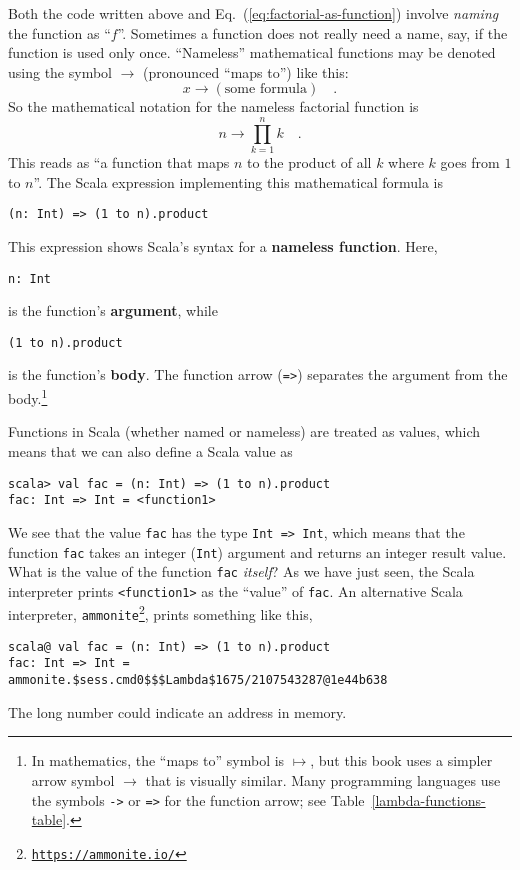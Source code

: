 Both the code written above and Eq.~(\ref{eq:factorial-as-function})
involve \emph{naming} the function as \textsf{``}$f$\textsf{''}. Sometimes a function
does not really need a name, \textemdash{} say, if the function is
used only once. \textsf{``}Nameless\textsf{''} mathematical functions may be denoted
using the symbol $\rightarrow$ (pronounced \textsf{``}maps to\textsf{''}) like this:
\[
x\rightarrow\left(\text{some formula}\right)\quad.
\]
So the mathematical notation for the nameless factorial function is
\[
n\rightarrow\prod_{k=1}^{n}k\quad.
\]
This reads as \textsf{``}a function that maps $n$ to the product of all $k$
where $k$ goes from $1$ to $n$\textsf{''}. The Scala expression implementing
this mathematical formula is
\begin{lstlisting}
(n: Int) => (1 to n).product
\end{lstlisting}
This expression shows Scala\textsf{'}s syntax for a \textbf{nameless function}.
Here, 
\begin{lstlisting}
n: Int
\end{lstlisting}
is the function\textsf{'}s \textbf{argument}, while
\begin{lstlisting}
(1 to n).product
\end{lstlisting}
is the function\textsf{'}s \textbf{body}. The function arrow (\lstinline!=>!)
separates the argument from the body.\footnote{In mathematics, the \textsf{``}maps to\textsf{''} symbol is $\mapsto$, but this book
uses a simpler arrow symbol $\rightarrow$ that is visually similar.
Many programming languages use the symbols \lstinline!->! or \lstinline!=>!
for the function arrow; see Table~\ref{lambda-functions-table}.} 

Functions in Scala (whether named or nameless) are treated as values,
which means that we can also define a Scala value as
\begin{lstlisting}
scala> val fac = (n: Int) => (1 to n).product
fac: Int => Int = <function1>
\end{lstlisting}
We see that the value \lstinline!fac! has the type \lstinline!Int => Int!,
which means that the function \lstinline!fac! takes an integer (\lstinline!Int!)
argument and returns an integer result value. What is the value of
the function \lstinline!fac! \emph{itself}? As we have just seen,
the Scala interpreter prints \lstinline!<function1>! as the \textsf{``}value\textsf{''}
of \lstinline!fac!. An alternative Scala interpreter, \texttt{ammonite}\footnote{\texttt{\href{https://ammonite.io/}{https://ammonite.io/}}},
prints something like this,
\begin{lstlisting}
scala@ val fac = (n: Int) => (1 to n).product
fac: Int => Int = ammonite.$sess.cmd0$$$Lambda$1675/2107543287@1e44b638
\end{lstlisting}
The long number could indicate an address in memory.

